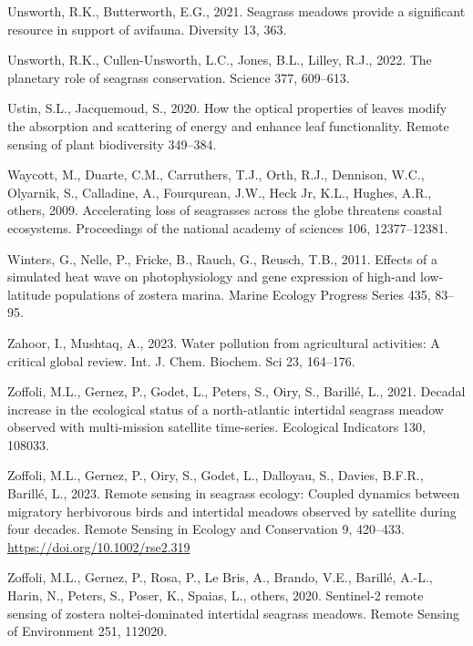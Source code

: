 \documentclass[
  letterpaper,
  DIV=11,
  numbers=noendperiod]{scrartcl}
\newlength{\cslhangindent}
\newenvironment{CSLReferences}[2] %
 {\begin{list}{}{%
  \setlength{\itemindent}{0pt}
  \setlength{\leftmargin}{0pt}
  \setlength{\parsep}{0pt}
  \ifodd #1
   \setlength{\leftmargin}{\cslhangindent}
   \setlength{\itemindent}{-1\cslhangindent}
  \fi
  \setlength{\itemsep}{#2\baselineskip}}}
 {\end{list}}
\begin{document}
\begin{CSLReferences}{1}{0}
Unsworth, R.K., Butterworth, E.G., 2021. Seagrass meadows provide a
significant resource in support of avifauna. Diversity 13, 363.

Unsworth, R.K., Cullen-Unsworth, L.C., Jones, B.L., Lilley, R.J., 2022.
The planetary role of seagrass conservation. Science 377, 609--613.

Ustin, S.L., Jacquemoud, S., 2020. How the optical properties of leaves
modify the absorption and scattering of energy and enhance leaf
functionality. Remote sensing of plant biodiversity 349--384.

Waycott, M., Duarte, C.M., Carruthers, T.J., Orth, R.J., Dennison, W.C.,
Olyarnik, S., Calladine, A., Fourqurean, J.W., Heck Jr, K.L., Hughes,
A.R., others, 2009. Accelerating loss of seagrasses across the globe
threatens coastal ecosystems. Proceedings of the national academy of
sciences 106, 12377--12381.

Winters, G., Nelle, P., Fricke, B., Rauch, G., Reusch, T.B., 2011.
Effects of a simulated heat wave on photophysiology and gene expression
of high-and low-latitude populations of zostera marina. Marine Ecology
Progress Series 435, 83--95.

Zahoor, I., Mushtaq, A., 2023. Water pollution from agricultural
activities: A critical global review. Int. J. Chem. Biochem. Sci 23,
164--176.

Zoffoli, M.L., Gernez, P., Godet, L., Peters, S., Oiry, S., Barillé, L.,
2021. Decadal increase in the ecological status of a north-atlantic
intertidal seagrass meadow observed with multi-mission satellite
time-series. Ecological Indicators 130, 108033.

Zoffoli, M.L., Gernez, P., Oiry, S., Godet, L., Dalloyau, S., Davies,
B.F.R., Barillé, L., 2023. Remote sensing in seagrass ecology: Coupled
dynamics between migratory herbivorous birds and intertidal meadows
observed by satellite during four decades. Remote Sensing in Ecology and
Conservation 9, 420--433. \url{https://doi.org/10.1002/rse2.319}

Zoffoli, M.L., Gernez, P., Rosa, P., Le Bris, A., Brando, V.E., Barillé,
A.-L., Harin, N., Peters, S., Poser, K., Spaias, L., others, 2020.
Sentinel-2 remote sensing of zostera noltei-dominated intertidal
seagrass meadows. Remote Sensing of Environment 251, 112020.

\end{CSLReferences}
\end{document}
